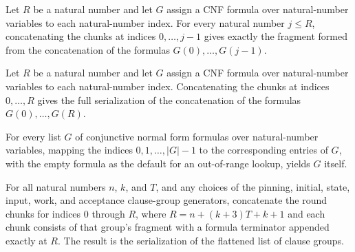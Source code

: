 \begin{lemma}
\label{Complexity.clChunks_before}
\leanok
{}
Let $R$ be a natural number and let $G$ assign a CNF formula over natural-number
variables to each natural-number index. For every natural number $j\le R$, concatenating
the chunks at indices $0,\ldots,j-1$ gives exactly the fragment formed from the
concatenation of the formulas $G(0),\ldots,G(j-1)$.
\end{lemma}

\begin{lemma}
\label{Complexity.clChunks_serialize}
\leanok
{}
Let $R$ be a natural number and let $G$ assign a CNF formula over natural-number
variables to each natural-number index. Concatenating the chunks at indices $0,\ldots,R$
gives the full serialization of the concatenation of the formulas $G(0),\ldots,G(R)$.
\end{lemma}

\begin{lemma}
\label{Complexity.clGroups_index}
\leanok
{}
For every list $G$ of conjunctive normal form formulas over natural-number variables,
mapping the indices $0,1,\ldots,|G|-1$ to the corresponding entries of $G$, with the
empty formula as the default for an out-of-range lookup, yields $G$ itself.
\end{lemma}

\begin{lemma}
\label{Complexity.clGroups_serialize}
\leanok
{}
For all natural numbers $n$, $k$, and $T$, and any choices of the pinning, initial,
state, input, work, and acceptance clause-group generators, concatenate the round chunks
for indices $0$ through $R$, where $R=n+(k+3)T+k+1$ and each chunk consists of that
group's fragment with a formula terminator appended exactly at $R$. The result is the
serialization of the flattened list of clause groups.
\end{lemma}

